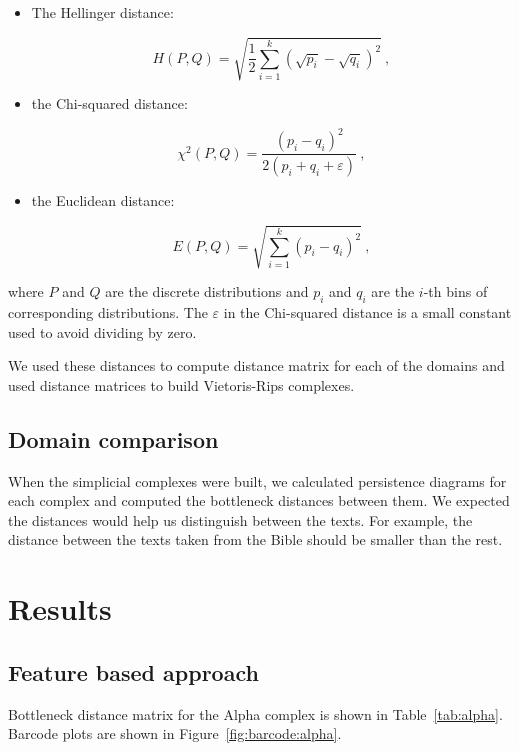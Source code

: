 \documentclass[12pt,a4paper]{amsart}
\begin{document}
\begin{itemize}
\item The Hellinger distance:

\begin{equation*}
  H(P,Q) = \sqrt{\frac{1}{2} \sum_{i=1}^k\left(\sqrt{p_i} -
    \sqrt{q_i}\right)^2}\ ,
\end{equation*}

\item the Chi-squared distance:

\begin{equation*}
  \chi^2(P,Q) = \frac{(p_i - q_i)^2}{2(p_i + q_i + \varepsilon)}\ ,
\end{equation*}

\item the Euclidean distance:

\begin{equation*}
  E(P,Q) = \sqrt{\sum_{i=1}^k\left(p_i - q_i\right)^2}\ ,
\end{equation*}
\end{itemize}

\noindent
where $P$ and $Q$ are the discrete distributions and $p_i$ and $q_i$ are the
$i$-th bins of corresponding distributions. The $\varepsilon$ in the Chi-squared
distance is a small constant used to avoid dividing by zero.

We used these distances to compute distance matrix for each of the
domains and used distance matrices to build Vietoris-Rips complexes.

\subsection{Domain comparison}

When the simplicial complexes were built, we calculated persistence diagrams for
each complex and computed the bottleneck distances between them. We expected the
distances would help us distinguish between the texts. For example, the distance
between the texts taken from the Bible should be smaller than the rest.

\section{Results}

\subsection{Feature based approach} Bottleneck
distance matrix for the Alpha complex is shown in Table~\ref{tab:alpha}. 
Barcode plots are shown in Figure~\ref{fig:barcode:alpha}.
\end{document}
